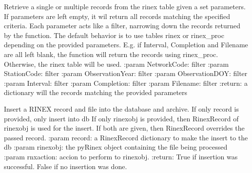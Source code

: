 \documentclass[letterpaper,10pt,english]{sphinxmanual}
\begin{document}
\begin{fulllineitems}
\begin{fulllineitems}
\label{\detokenize{pgamit.classes:pgamit.classes.pyArchiveStruct.RinexStruct.get_rinex_record}}
\pysigstartsignatures
\pysiglinewithargsret
{}
{}
{}
\pysigstopsignatures
\sphinxAtStartPar
Retrieve a single or multiple records from the rinex table given a set parameters. If parameters are left empty,
it wil return all records matching the specified criteria. Each parameter acts like a filter, narrowing down the
records returned by the function. The default behavior is to use tables rinex or rinex\_proc depending on the
provided parameters. E.g. if Interval, Completion and Filename are all left blank, the function will return the
records using rinex\_proc. Otherwise, the rinex table will be used.
:param NetworkCode: filter
:param StationCode: filter
:param ObservationYear: filter
:param ObservationDOY: filter
:param Interval: filter
:param Completion: filter
:param Filename: filter
:return: a dictionary will the records matching the provided parameters

\end{fulllineitems}


\begin{fulllineitems}
\label{\detokenize{pgamit.classes:pgamit.classes.pyArchiveStruct.RinexStruct.insert_rinex}}
\pysigstartsignatures
\pysiglinewithargsret
{}
{\sphinxparamcomma {}}
{}
\pysigstopsignatures
\sphinxAtStartPar
Insert a RINEX record and file into the database and archive. If only record is provided, only insert into db
If only rinexobj is provided, then RinexRecord of rinexobj is used for the insert. If both are given, then
RinexRecord overrides the passed record.
:param record: a RinexRecord dictionary to make the insert to the db
:param rinexobj: the pyRinex object containing the file being processed
:param rnxaction: accion to perform to rinexobj.
:return: True if insertion was successful. False if no insertion was done.

\end{fulllineitems}


\end{fulllineitems}
\end{document}
